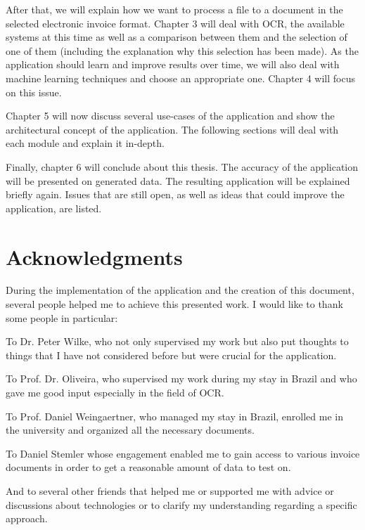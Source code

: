 After that, we will explain how we want to process a file to a document in the selected electronic invoice format. Chapter 3 will deal with OCR, the available systems at this time as well as a comparison between them and the selection of one of them (including the explanation why this selection has been made).
As the application should learn and improve results over time, we will also deal with machine learning techniques and choose an appropriate one. Chapter 4 will focus on this issue.

Chapter 5 will now discuss several use-cases of the application and show the architectural concept of the application. The following sections will deal with each module and explain it in-depth.

Finally, chapter 6 will conclude about this thesis. The accuracy of the application will be presented on generated data. The resulting application will be explained briefly again. Issues that are still open, as well as ideas that could improve the application, are listed.

\section{Acknowledgments}
\label{sec1.7}

During the implementation of the application and the creation of this document, several people helped me to achieve this presented work. I would like to thank some people in particular:

To Dr. Peter Wilke, who not only supervised my work but also put thoughts to things that I have not considered before but were crucial for the application.

To Prof. Dr. Oliveira, who supervised my work during my stay in Brazil and who gave me good input especially in the field of OCR.

To Prof. Daniel Weingaertner, who managed my stay in Brazil, enrolled me in the university and organized all the necessary documents.

To Daniel Stemler whose engagement enabled me to gain access to various invoice documents in order to get a reasonable amount of data to test on.

And to several other friends that helped me or supported me with advice or discussions about technologies or to clarify my understanding regarding a specific approach.